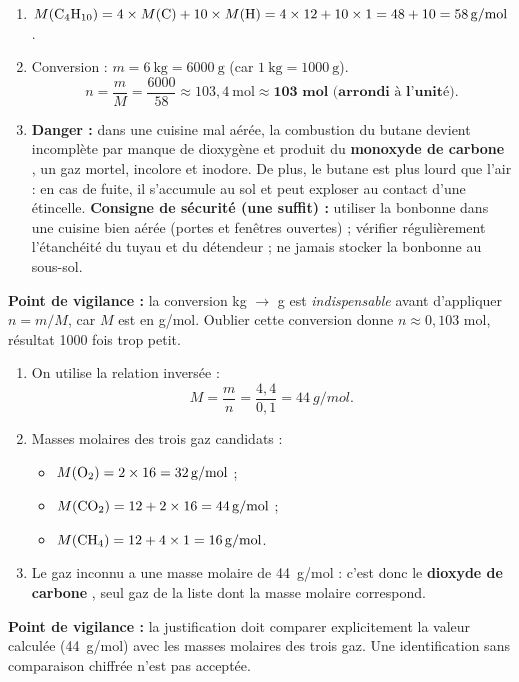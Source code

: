 \documentclass[11pt]{article}
\begin{document}
\begin{corrige}
\begin{enumerate}
\item $M(\ce{C4H10}) = 4\times M(\ce{C}) + 10\times M(\ce{H}) = 4\times 12 + 10\times 1 = 48 + 10 = \SI{58}{g/mol}$.
\item Conversion : $m = 6\ \text{kg} = 6000\ \text{g}$ (car $1\ \text{kg} = 1000\ \text{g}$).
\[ n = \dfrac{m}{M} = \dfrac{6000}{58} \approx 103,4\ \text{mol} \approx \textbf{103 mol (arrondi à l'unité)}. \]
\item \textbf{Danger :} dans une cuisine mal aérée, la combustion du butane devient incomplète par manque de dioxygène et produit du \textbf{monoxyde de carbone }, un gaz mortel, incolore et inodore. De plus, le butane est plus lourd que l'air : en cas de fuite, il s'accumule au sol et peut exploser au contact d'une étincelle.
\textbf{Consigne de sécurité (une suffit) :} utiliser la bonbonne dans une cuisine bien aérée (portes et fenêtres ouvertes) ; vérifier régulièrement l'étanchéité du tuyau et du détendeur ; ne jamais stocker la bonbonne au sous-sol.
\end{enumerate}
\textbf{Point de vigilance :} la conversion kg $\rightarrow$ g est \emph{indispensable} avant d'appliquer $n = m/M$, car $M$ est en \unit{g/mol}. Oublier cette conversion donne $n \approx 0,103$ mol, résultat 1000 fois trop petit.
\end{corrige}

\begin{corrige}
\begin{enumerate}
\item On utilise la relation inversée :
\[ M = \dfrac{m}{n} = \dfrac{4,4}{0,1} = \SI{44}{g/mol}. \]
\item Masses molaires des trois gaz candidats :
\begin{itemize}
\item $M(\ce{O2}) = 2\times 16 = \SI{32}{g/mol}$ ;
\item $M(\ce{CO2}) = 12 + 2\times 16 = \SI{44}{g/mol}$ ;
\item $M(\ce{CH4}) = 12 + 4\times 1 = \SI{16}{g/mol}$.
\end{itemize}
\item Le gaz inconnu a une masse molaire de \SI{44}{g/mol} : c'est donc le \textbf{dioxyde de carbone }, seul gaz de la liste dont la masse molaire correspond.
\end{enumerate}
\textbf{Point de vigilance :} la justification doit comparer explicitement la valeur calculée (\SI{44}{g/mol}) avec les masses molaires des trois gaz. Une identification sans comparaison chiffrée n'est pas acceptée.
\end{corrige}
\end{document}
